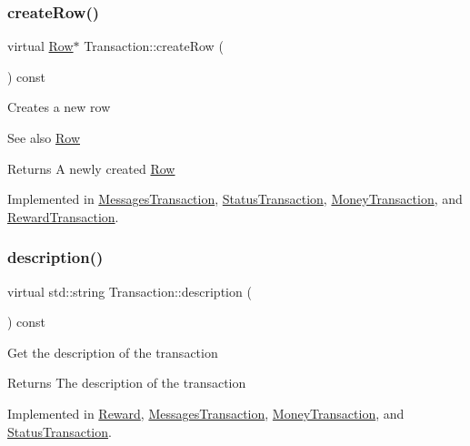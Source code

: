 \subsubsection{\texorpdfstring{create\+Row()}{createRow()}}
{\footnotesize\ttfamily virtual \mbox{\hyperlink{classRow}{Row}}$\ast$ Transaction\+::create\+Row (\begin{DoxyParamCaption}{ }\end{DoxyParamCaption}) const\hspace{0.3cm}{\ttfamily [pure virtual]}}

Creates a new row \begin{DoxySeeAlso}{See also}
\mbox{\hyperlink{classRow}{Row}}
\end{DoxySeeAlso}
\begin{DoxyReturn}{Returns}
A newly created \mbox{\hyperlink{classRow}{Row}} 
\end{DoxyReturn}


Implemented in \mbox{\hyperlink{classMessagesTransaction_a3eec18f09aa102b3cee7f215c225a8fb}{Messages\+Transaction}}, \mbox{\hyperlink{classStatusTransaction_adbd4d2730ccd884e64f9a6bd30487a3c}{Status\+Transaction}}, \mbox{\hyperlink{classMoneyTransaction_a53b636ba053baae7705976efce629d21}{Money\+Transaction}}, and \mbox{\hyperlink{classRewardTransaction_ad43c1d706406f40d43f433b0d0b0b510}{Reward\+Transaction}}.

\mbox{\label{classTransaction_ad27fb61fcd91863c57ba96a7159b4e8a}} 
\subsubsection{\texorpdfstring{description()}{description()}}
{\footnotesize\ttfamily virtual std\+::string Transaction\+::description (\begin{DoxyParamCaption}{ }\end{DoxyParamCaption}) const\hspace{0.3cm}{\ttfamily [pure virtual]}}

Get the description of the transaction

\begin{DoxyReturn}{Returns}
The description of the transaction 
\end{DoxyReturn}


Implemented in \mbox{\hyperlink{classReward_a95e98fc9dbbc9da47cee243adc1932d2}{Reward}}, \mbox{\hyperlink{classMessagesTransaction_a8cf65215291254275a1dd989f0971bd4}{Messages\+Transaction}}, \mbox{\hyperlink{classMoneyTransaction_a23b793077f5c5e3157155df148e0d5e1}{Money\+Transaction}}, and \mbox{\hyperlink{classStatusTransaction_a1f6c6fd3f04ba1483028aee23bd862da}{Status\+Transaction}}.

